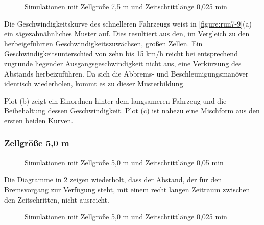 \begin{figure}[hptb]
  \centering 
   \qquad 
   \qquad 
  \caption{Simulationen mit Zellgröße 7,5 m und Zeitschrittlänge 0,025 min} 
  \label{figure:run7-8}
\end{figure}

Die Geschwindigkeitskurve des schnelleren Fahrzeugs weist in \cref{figure:run7-9}(a) ein sägezahnähnliches Muster auf.
Dies resultiert aus den, im Vergleich zu den herbeigeführten Geschwindigkeitszuwächsen, großen Zellen.
Ein Geschwindigkeitsunterschied von zehn bis 15 km/h reicht bei entsprechend zugrunde liegender Ausgangsgeschwindigkeit nicht aus, eine Verkürzung des Abstands herbeizuführen.
Da sich die Abbrems- und Beschleunigungsmanöver identisch wiederholen, kommt es zu dieser Musterbildung.

Plot (b) zeigt ein Einordnen hinter dem langsameren Fahrzeug und die Beibehaltung dessen Geschwindigkeit.
Plot (c) ist nahezu eine Mischform aus den ersten beiden Kurven.

\subsubsection{Zellgröße 5,0 m}

\begin{figure}[hptb]
  \centering 
   \qquad 
   \qquad 
  \caption{Simulationen mit Zellgröße 5,0 m und Zeitschrittlänge 0,05 min} 
  \label{figure:run14-16}
\end{figure}

Die Diagramme in \cref{figure:run14-16} zeigen wiederholt, dass der Abstand, der für den Bremsvorgang zur Verfügung steht, mit einem recht langen Zeitraum zwischen den Zeitschritten, nicht ausreicht.

\begin{figure}[hptb]
  \centering 
   \qquad 
   \qquad 
  \caption{Simulationen mit Zellgröße 5,0 m und Zeitschrittlänge 0,025 min} 
  \label{figure:run17-19}
\end{figure}


